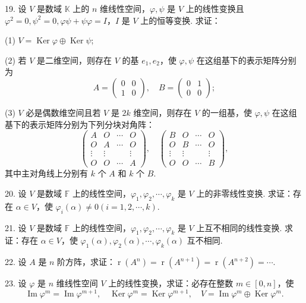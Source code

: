 \documentclass[UTF8, 12pt, fontset=fandol, oneside]{ctexart}
\begin{document}
19. 设 $V$ 是数域 $\mathbb{K}$ 上的 $n$ 维线性空间，$\varphi,\psi$ 是 $V$ 上的线性变换且 $\varphi^2=0,\psi^2=0,\varphi\psi+\psi\varphi=I$，$I$ 是 $V$ 上的恒等变换. 求证：

(1) $V=\operatorname{Ker}\varphi\oplus\operatorname{Ker}\psi$;

(2) 若 $V$ 是二维空间，则存在 $V$ 的基 $e_1,e_2$，使 $\varphi,\psi$ 在这组基下的表示矩阵分别为
\[
A=\left(\begin{array}{cc}
0&0\\
1&0
\end{array}\right),\quad
B=\left(\begin{array}{cc}
0&1\\
0&0
\end{array}\right);
\]

(3) $V$ 必是偶数维空间且若 $V$ 是 $2k$ 维空间，则存在 $V$ 的一组基，使 $\varphi,\psi$ 在这组基下的表示矩阵分别为下列分块对角阵：
\[
\left(\begin{array}{cccc}
A&O&\cdots&O\\
O&A&\cdots&O\\
\vdots&\vdots&&\vdots\\
O&O&\cdots&A
\end{array}\right),\quad
\left(\begin{array}{cccc}
B&O&\cdots&O\\
O&B&\cdots&O\\
\vdots&\vdots&&\vdots\\
O&O&\cdots&B
\end{array}\right),
\]
其中主对角线上分别有 $k$ 个 $A$ 和 $k$ 个 $B$.

20. 设 $V$ 是数域 $\mathbb{F}$ 上的线性空间，$\varphi_1,\varphi_2,\cdots,\varphi_k$ 是 $V$ 上的非零线性变换. 求证：存在 $\alpha\in V$，使 $\varphi_i(\alpha)\neq 0(i=1,2,\cdots,k)$.

21. 设 $V$ 是数域 $\mathbb{F}$ 上的线性空间，$\varphi_1,\varphi_2,\cdots,\varphi_k$ 是 $V$ 上互不相同的线性变换. 求证：存在 $\alpha\in V$，使 $\varphi_1(\alpha),\varphi_2(\alpha),\cdots,\varphi_k(\alpha)$ 互不相同.

22. 设 $A$ 是 $n$ 阶方阵，求证：$\operatorname{r}(A^n)=\operatorname{r}(A^{n+1})=\operatorname{r}(A^{n+2})=\cdots$.

23. 设 $\varphi$ 是 $n$ 维线性空间 $V$ 上的线性变换，求证：必存在整数 $m\in[0,n]$，使
\[
\operatorname{Im}\varphi^m=\operatorname{Im}\varphi^{m+1},\quad \operatorname{Ker}\varphi^m=\operatorname{Ker}\varphi^{m+1},\quad V=\operatorname{Im}\varphi^m\oplus\operatorname{Ker}\varphi^m.
\]
\end{document}
